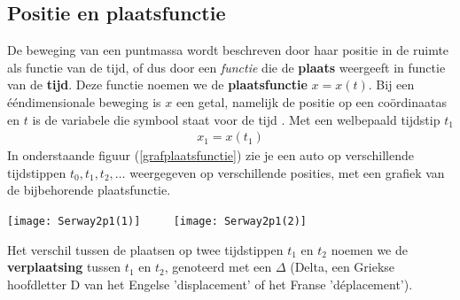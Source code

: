 \documentclass{ximera}
\begin{document}
	\author{Bart Lambregs}
    \xmsource\xmuitleg







\subsection*{Positie en plaatsfunctie}

	De beweging van een puntmassa wordt beschreven door haar positie in de ruimte als functie van de tijd, of dus door een \textit{functie} die de \textbf{plaats} weergeeft in functie van de \textbf{tijd}. Deze functie noemen we de \textbf{plaatsfunctie} $x = x(t)$. 
	Bij een ééndimensionale beweging is $x$ een getal, namelijk de positie op een coördinaatas
	en $t$ is de variabele die symbool staat voor de tijd
	. 
	Met een welbepaald tijdstip $t_1$ 
	\begin{eqnarray*}
	x_1=x(t_1)
	\end{eqnarray*}
	In onderstaande figuur (\ref{grafplaatsfunctie}) zie je een auto op verschillende tijdstippen $t_0,t_1, t_2,\ldots$ weer\-ge\-ge\-ven op verschillende posities, met een grafiek van de bijbehorende plaatsfunctie.
	
	\begin{image}
	\texttt{[image: Serway2p1(1)]}
	$\qquad$   %
	\texttt{[image: Serway2p1(2)]}
	\end{image}
	
	Het verschil tussen de plaatsen op twee tijdstippen $t_1$ en $t_2$ noemen we de \textbf{verplaatsing} tussen $t_1$ en $t_2$, genoteerd met een $\Delta$ (Delta, een Griekse hoofdletter D  van het Engelse 'displacement' of het Franse 'déplacement').
\end{document}
